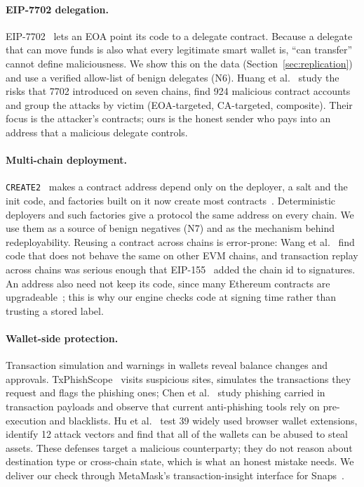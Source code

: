 \documentclass[runningheads]{llncs}
\begin{document}
\paragraph{EIP-7702 delegation.} EIP-7702~\cite{eip7702} lets an EOA point its
code to a delegate contract. Because a delegate that can move funds is also what
every legitimate smart wallet is, ``can transfer'' cannot define maliciousness.
We show this on the data (Section~\ref{sec:replication}) and use a verified
allow-list of benign delegates (N6). Huang et al.~\cite{huang2026eip7702}
study the risks that 7702 introduced on seven chains, find 924 malicious
contract accounts and group the attacks by victim (EOA-targeted, CA-targeted,
composite). Their focus is the attacker's contracts; ours is the honest sender
who pays into an address that a malicious delegate controls.

\paragraph{Multi-chain deployment.} \texttt{CREATE2}~\cite{eip1014} makes a
contract address depend only on the deployer, a salt and the init code, and
factories built on it now create most contracts~\cite{wang2026factories}.
Deterministic deployers and such factories give a protocol the same address on
every chain. We use them as a source of benign negatives (N7) and as the
mechanism behind redeployability. Reusing a contract across chains is
error-prone: Wang et al.~\cite{wang2025copypaste} find code that does not behave
the same on other EVM chains, and transaction replay across chains was serious
enough that EIP-155~\cite{eip155} added the chain id to signatures. An address
also need not keep its code, since many Ethereum contracts are
upgradeable~\cite{salehi2022immutable}; this is why our engine checks code at
signing time rather than trusting a stored label.

\paragraph{Wallet-side protection.} Transaction simulation and warnings in
wallets reveal balance changes and approvals. TxPhishScope~\cite{he2023txphishscope}
visits suspicious sites, simulates the transactions they request and flags the
phishing ones; Chen et al.~\cite{chen2025payload} study phishing carried in
transaction payloads and observe that current anti-phishing tools rely on
pre-execution and blacklists. Hu et al.~\cite{hu2026walletruth} test 39 widely
used browser wallet extensions, identify 12 attack vectors and find that all of
the wallets can be abused to steal assets. These defenses target a malicious counterparty; they do not
reason about destination type or cross-chain state, which is what an honest
mistake needs. We deliver our check through MetaMask's transaction-insight
interface for Snaps~\cite{metamask_insights}.
\end{document}
